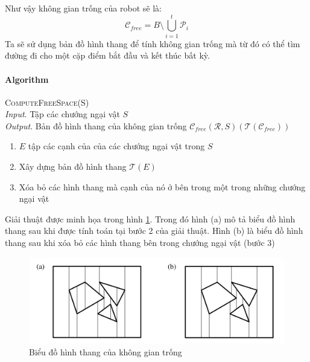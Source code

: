 \documentclass[a4paper,12pt]{report}
\begin{document}
Như vậy không gian trống của robot sẽ là:
$$\mathcal{C}_{free} = B \setminus \bigcup_{i=1}^t \mathcal{P}_i$$
Ta sẽ sử dụng bản đồ hình thang để tính không gian trống mà từ đó có thể tìm đường đi cho một cặp điểm bắt đầu và kết thúc bất kỳ.

\paragraph{Algorithm} \textsc{ComputeFreeSpace(S)}\\
\emph{Input}. Tập các chướng ngại vật $S$\\
\emph{Output}. Bản đồ hình thang của không gian trống $\mathcal{C}_{free}(\mathcal{R},S) (\mathcal{T}(\mathcal{C}_{free}))$
\begin{enumerate}
\item $E$ tập các cạnh của của các chướng ngại vật trong $S$
\item Xây dựng bản đồ hình thang $\mathcal{T}(E)$
\item Xóa bỏ các hình thang mà cạnh của nó ở bên trong một trong những chướng ngại vật 
\end{enumerate}

Giải thuật được minh họa trong hình \ref{fig_trapezoidal_free_space}. Trong đó hình (a) mô tả biểu đồ hình thang sau khi được tính toán tại bước 2 của giải thuật. Hình (b) là biểu đồ hình thang sau khi xóa bỏ các hình thang bên trong chướng ngại vật (bước 3)
\begin{figure}[H]
\centering
\includegraphics[scale=0.3]{trapezoidal_free_space.png}
\caption{Biểu đồ hình thang của không gian trống}
\label{fig_trapezoidal_free_space}
\end{figure}
\end{document}
